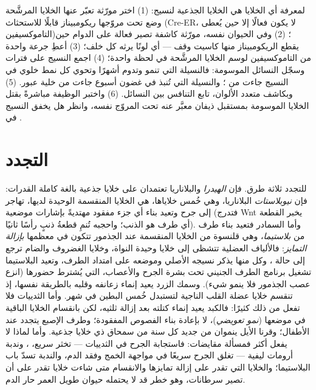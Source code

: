 \begin{method}\label{met:b3:stem-cells:tracing}
لمعرفة أي الخلايا هي الخلايا الجذعية لنسيج: (1) اختر مورّثة
تعبّر عنها الخلايا المرشَّحة وضع تحت مروّجها ريكومبيناز
قابلًا للاستحثاث (Cre-ER، لا يكون فعالًا إلا حين يُعطى
التاموكسيفين)؛ (2) وفي الحيوان نفسه، مورّثة كاشفة تصير فعالة
على الدوام حين يقطع الريكومبيناز منها كاسيت وقف --- أي لونًا
يرثه كل خلف؛ (3) أعطِ جرعة واحدة من التاموكسيفين لوسم
الخلايا المرشَّحة في لحظة واحدة؛ (4) اجمع النسيج على فترات
وسجّل النسائل الموسومة: فالنسيلة التي تنمو وتدوم أشهرًا
وتحوي كل نمط خلوي في النسيج جاءت من ؛ والنسيلة
التي تُنبذ في غضون أسبوع جاءت من خلية عبور. (5) وبكاشف متعدد
الألوان، تابع التنافس بين النسائل. (6) واختبر الوظيفة
مباشرةً بقتل الخلايا الموسومة بمستقبل ذيفان معبَّر عنه تحت
المروّج نفسه، وانظر هل يخفق النسيج في .
\end{method}

\section{التجدد}

\begin{definition}\label{def:b3:stem-cells:regeneration}
للتجدد ثلاثة طرق. فإن \emph{الهيدرا} والبلاناريا تعتمدان على
خلايا جذعية بالغة كاملة القدرات: فإن \emph{نيوبلاستات}
البلاناريا، وهي خُمس خلاياها، هي الخلايا المنقسمة الوحيدة
لديها، تهاجر إلى جرح وتعيد بناء أي جزء مفقود مهتديةً بإشارات
موضعية (فتدرج Wnt يخبر القطعة أي طرف هو الذنب؛ واحجبه تُنمِ
قطعةُ ذنبٍ رأسًا ثانيًا). وأما السمادر فتعيد بناء طرف من
\emph{بلاستيما}، وهي قلنسوة من الخلايا المنقسمة عند الجذمور
تتكون في معظمها \emph{بإزالة التمايز}: فالألياف العضلية
تتشظى إلى خلايا وحيدة النواة، وخلايا الغضروف والضام ترجع إلى
حالة ، وكل منها يذكر نسيجه الأصلي وموضعه على امتداد
الطرف، وتعيد البلاستيما تشغيل برنامج الطرف الجنيني تحت بشرة
الجرح والأعصاب، التي يُشترط حضورها (انزع عصب الجذمور فلا
ينمو شيء). وسمك الزرد يعيد إنماء زعانفه وقلبه بالطريقة نفسها،
إذ تنقسم خلايا عضلة القلب الناجية لتستبدل خُمس البطين في
شهر. وأما الثدييات فلا تفعل من ذلك كثيرًا: فالكبد يعيد إنماء
كتلته بعد إزالة ثلثيه، لكن بانقسام الخلايا الباقية في
موضعها (\emph{نمو تعويضي})، لا بإعادة بناء الفصوص المفقودة؛
وطرف الإصبع يتجدد عند الأطفال؛ وقرنا الأيل ينموان من جديد كل
سنة من سمحاق ذي خلايا جذعية. وأما لماذا لا يفعل أكثر فمسألة
مقايضات: فاستجابة الجرح في الثدييات --- تخثر سريع، ،
وندبة أرومات ليفية --- تغلق الجرح سريعًا في مواجهة الخمج
وفقد الدم، والندبة تسدّ باب البلاستيما؛ والخلايا التي تقدر
على إزالة تمايزها والانقسام متى شاءت خلايا تقدر على أن تصير
سرطانات، وهو خطر قد لا يحتمله حيوان طويل العمر حار الدم.
\end{definition}

